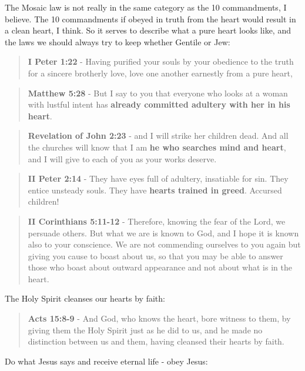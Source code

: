 \documentclass[11pt]{article}
\begin{document}
The Mosaic law is not really in the same category as the 10 commandments, I believe. The 10 commandments if obeyed in truth from the heart would result in a clean heart, I think. So it serves to describe what a pure heart looks like, and the laws we should always try to keep whether Gentile or Jew:

\begin{quote}
\textbf{I Peter 1:22} - Having purified your souls by your obedience to the truth for a sincere brotherly love, love one another earnestly from a pure heart,
\end{quote}

\begin{quote}
\textbf{Matthew 5:28} - But I say to you that everyone who looks at a woman with lustful intent has \textbf{already committed adultery with her in his heart}.
\end{quote}

\begin{quote}
\textbf{Revelation of John 2:23} - and I will strike her children dead. And all the churches will know that I am \textbf{he who searches mind and heart}, and I will give to each of you as your works deserve.
\end{quote}


\begin{quote}
\textbf{II Peter 2:14} - They have eyes full of adultery, insatiable for sin. They entice unsteady souls. They have \textbf{hearts trained in greed}. Accursed children!
\end{quote}

\begin{quote}
\textbf{II Corinthians 5:11-12} - Therefore, knowing the fear of the Lord, we persuade others. But what we are is known to God, and I hope it is known also to your conscience. We are not commending ourselves to you again but giving you cause to boast about us, so that you may be able to answer those who boast about outward appearance and not about what is in the heart.
\end{quote}

The Holy Spirit cleanses our hearts by faith:

\begin{quote}
\textbf{Acts 15:8-9} - And God, who knows the heart, bore witness to them, by giving them the Holy Spirit just as he did to us, and he made no distinction between us and them, having cleansed their hearts by faith.
\end{quote}

Do what Jesus says and receive eternal life - obey Jesus:
\end{document}
